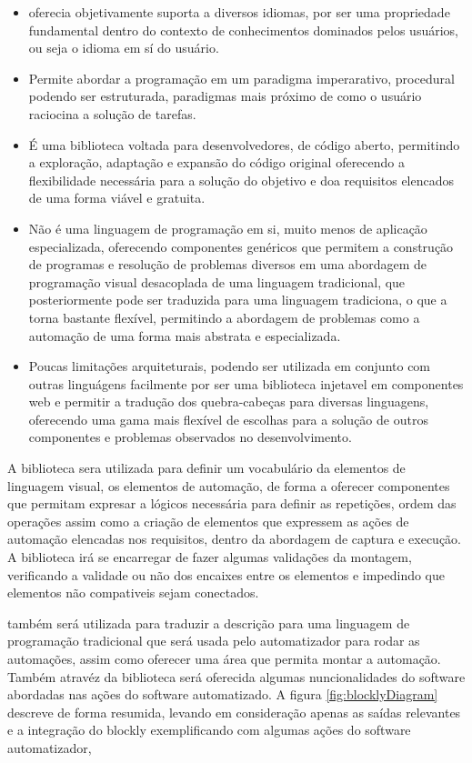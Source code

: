 \documentclass[tg]{mdtufsm}
\begin{document}
                \begin{itemize}
                    \item oferecia objetivamente suporta a diversos idiomas, por ser uma propriedade fundamental dentro do contexto de conhecimentos dominados pelos usuários, ou seja o idioma em sí do usuário.
                    \item Permite abordar a programação em um paradigma imperarativo, procedural podendo ser estruturada, paradigmas mais próximo de como o usuário raciocina a solução de tarefas.
                    \item É uma biblioteca voltada para desenvolvedores, de código aberto, permitindo a exploração, adaptação e expansão do código original oferecendo a flexibilidade necessária para a solução do objetivo e doa requisitos elencados de uma forma viável e gratuita.
                    \item Não é uma linguagem de programação em si, muito menos de aplicação especializada, oferecendo componentes genéricos que permitem a construção de programas e resolução de problemas diversos em uma abordagem de programação visual desacoplada de uma linguagem tradicional, que posteriormente pode ser traduzida para uma linguagem tradiciona, o que a torna bastante flexível, permitindo a abordagem de problemas como a automação de uma forma mais abstrata e especializada.
                    \item Poucas limitações arquiteturais, podendo ser utilizada em conjunto com outras linguágens facilmente por ser uma biblioteca injetavel em componentes web e permitir a tradução dos quebra-cabeças para diversas linguagens, oferecendo uma gama mais flexível de escolhas para a solução de outros componentes e problemas observados no desenvolvimento.
                \end{itemize}

                A biblioteca sera utilizada para definir um vocabulário da elementos de linguagem visual, os elementos de automação, de forma a oferecer componentes que permitam expresar a lógicos necessária para definir as repetições, ordem das operações assim como a criação de elementos que expressem as ações de automação elencadas nos requisitos, dentro da abordagem de captura e execução. A biblioteca irá se encarregar de fazer algumas validações da montagem, verificando a validade ou não dos encaixes entre os elementos e impedindo que elementos não compativeis sejam conectados.

                também será utilizada para traduzir a descrição para uma linguagem de programação tradicional que será usada pelo automatizador para rodar as automações, assim como oferecer uma área que permita montar a automação. Também atravéz da biblioteca será oferecida algumas nuncionalidades do software abordadas nas ações do software automatizado. A figura \ref{fig:blocklyDiagram} descreve de forma resumida, levando em consideração apenas as saídas relevantes e a integração do blockly exemplificando com algumas ações do software automatizador,
\end{document}
